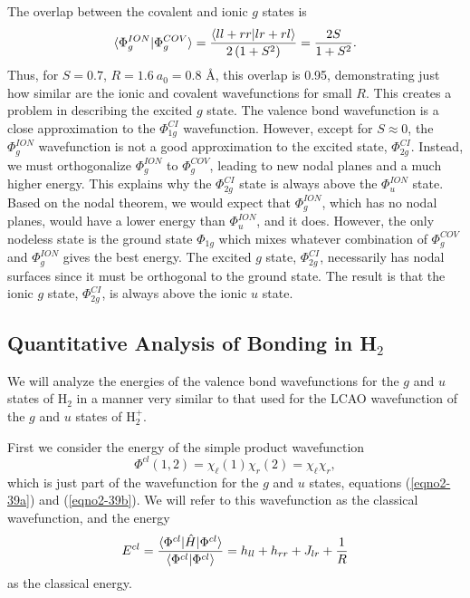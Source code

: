 The overlap between the covalent and ionic $g$ states is
\begin{equation}
\langle \Phi^{ION}_g \vert \Phi^{COV}_g \rangle = { \langle ll + rr 
\vert lr + rl \rangle \over 2 \left( 1 + S^2 \right)} = {2S \over 1 + 
S^2} .
\end{equation}
Thus, for $S = 0.7$, $R = 1.6\ a_0 = 0.8$ \AA, this overlap is 0.95,
demonstrating just how similar are the ionic and covalent
wavefunctions for small $R$.  This creates a problem in describing the
excited $g$ state. The valence bond wavefunction is a close
approximation to the $\Phi^{CI}_{1g}$ wavefunction.  However, except
for $S \approx 0$, the $\Phi^{ION}_g$ wavefunction is not a good
approximation to the excited state, $\Phi^{CI}_{2g}$.  Instead, we
must orthogonalize $\Phi^{ION}_g$ to $\Phi^{COV}_g$, leading to new
nodal planes and a much higher energy.  This explains why the
$\Phi^{CI}_{2g}$ state is always above the $\Phi^{ION}_u$ state. Based
on the nodal theorem, we would expect that $\Phi^{ION}_g$, which has
no nodal planes, would have a lower energy than $\Phi^{ION}_u$, and it
does.  However, the only nodeless state is the ground state
$\Phi_{1g}$ which mixes whatever combination of $\Phi^{COV}_g$ and
$\Phi^{ION}_g$ gives the best energy. The excited $g$ state,
$\Phi^{CI}_{2g}$, necessarily has nodal surfaces since it must be
orthogonal to the ground state. The result is that the ionic $g$
state, $\Phi^{CI}_{2g}$, is always above the ionic $u$ state.

\subsection{Quantitative Analysis of Bonding in H$_2$}
    
We will analyze the energies of the valence bond wavefunctions for the
$g$ and $u$ states of H$_2$ in a manner very similar to that used for
the LCAO wavefunction of the $g$ and $u$ states of H$^+_2$.
    
First we consider the energy of the simple product wavefunction
\begin{equation}
\Phi^{cl} ( 1 , 2 ) = \chi_\ell ( 1 ) \chi_r ( 2 ) = \chi_\ell \chi_r ,
\end{equation}    
which is just part of the wavefunction for the $g$ and $u$ states,
equations (\ref{eqno2-39a}) and (\ref{eqno2-39b}). We will refer to
this wavefunction as the classical wavefunction, and the energy
\begin{equation}
E^{cl} = {\langle \Phi^{cl} \vert {\hat H} \vert \Phi^{cl} \rangle 
\over \langle \Phi^{cl} \vert \Phi^{cl} \rangle} = h_{ll} + 
h_{rr} + J_{lr} + {1 \over R}
\label{eqno2-43}
\end{equation}
as the classical energy.
    

